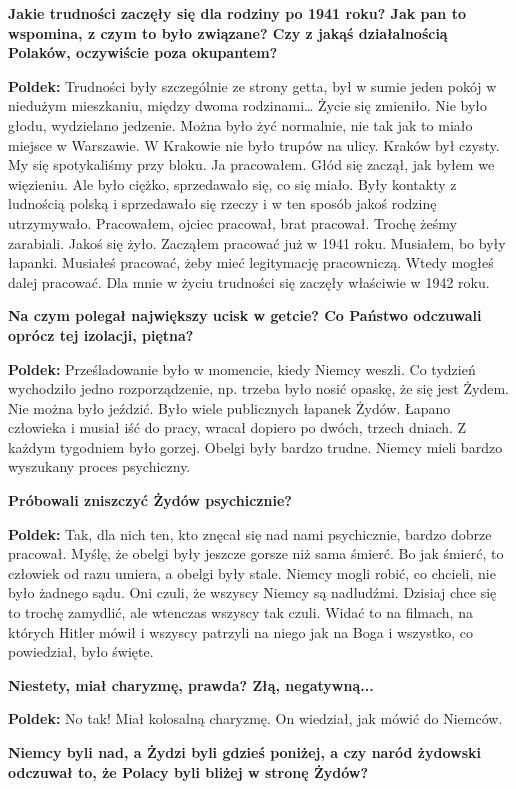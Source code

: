 \begin{otherlanguage}{polish}
\textbf{Jakie trudności zaczęły się dla rodziny po 1941 roku? Jak pan to wspomina, z czym to było związane? Czy z jakąś działalnością Polaków, oczywiście poza okupantem?}

\textbf{Poldek:} Trudności były szczególnie ze strony getta, był w sumie jeden pokój w niedużym mieszkaniu, między dwoma rodzinami… Życie się zmieniło. Nie było głodu, wydzielano jedzenie. Można było żyć normalnie, nie tak jak to miało miejsce w Warszawie. W Krakowie nie było trupów na ulicy. Kraków był czysty. My się spotykaliśmy przy bloku. Ja pracowałem. Głód się zaczął, jak byłem we więzieniu. Ale było ciężko, sprzedawało się, co się miało. Były kontakty z ludnością polską i sprzedawało się rzeczy i w ten sposób jakoś rodzinę utrzymywało. Pracowałem, ojciec pracował, brat pracował. Trochę żeśmy zarabiali. Jakoś się żyło. Zacząłem pracować już w 1941 roku. Musiałem, bo były łapanki. Musiałeś pracować, żeby mieć legitymację pracowniczą. Wtedy mogłeś dalej pracować. Dla mnie w życiu trudności się zaczęły właściwie w 1942 roku.
 
\textbf{Na czym polegał największy ucisk w getcie? Co Państwo odczuwali oprócz tej izolacji, piętna?}

\textbf{Poldek:} Prześladowanie było w momencie, kiedy Niemcy weszli. Co tydzień wychodziło jedno rozporządzenie, np. trzeba było nosić opaskę, że się jest Żydem. Nie można było jeździć. Było wiele publicznych łapanek Żydów. Łapano człowieka i musiał iść do pracy, wracał dopiero po dwóch, trzech dniach. Z każdym tygodniem było gorzej. Obelgi były bardzo trudne. Niemcy mieli bardzo wyszukany proces psychiczny.

\textbf{Próbowali zniszczyć Żydów psychicznie?}

\textbf{Poldek:} Tak, dla nich ten, kto znęcał się nad nami psychicznie, bardzo dobrze pracował. Myślę, że obelgi były jeszcze gorsze niż sama śmierć. Bo jak śmierć, to człowiek od razu umiera, a obelgi były stale. Niemcy mogli robić, co chcieli, nie było żadnego sądu. Oni czuli, że wszyscy Niemcy są nadludźmi. Dzisiaj chce się to trochę zamydlić, ale wtenczas wszyscy tak czuli. Widać to na filmach, na których Hitler mówił i wszyscy patrzyli na niego jak na Boga i wszystko, co powiedział, było święte. 
  
\textbf{Niestety, miał charyzmę, prawda? Złą, negatywną... }

\textbf{Poldek:} No tak! Miał kolosalną charyzmę. On wiedział, jak mówić do Niemców.

\textbf{Niemcy byli nad, a Żydzi byli gdzieś poniżej, a czy naród żydowski odczuwał to, że Polacy byli bliżej w stronę Żydów?}
 

\end{otherlanguage}
